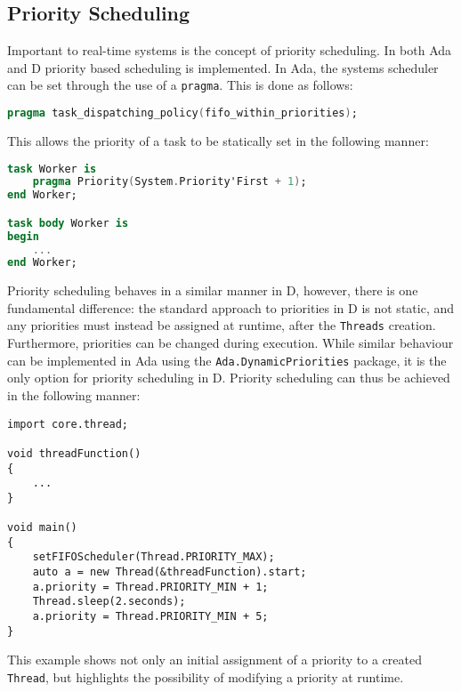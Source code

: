 \subsection{Priority Scheduling}
Important to real-time systems is the concept of priority scheduling. In both
Ada and D priority based scheduling is implemented. In Ada, the systems scheduler can
be set through the use of a \texttt{pragma}. This is done as follows: 
\begin{lstlisting}[basicstyle=\small,language=Ada]
pragma task_dispatching_policy(fifo_within_priorities); 
\end{lstlisting}
This allows the priority of a task to be statically set in the following manner: 
\begin{lstlisting}[basicstyle=\small,language=Ada]
task Worker is 
    pragma Priority(System.Priority'First + 1); 
end Worker;

task body Worker is 
begin 
    ...
end Worker; 
\end{lstlisting}
Priority scheduling behaves in a similar manner in D, however, there is one
fundamental difference: the standard approach to priorities in D is not static, 
and any priorities must instead be assigned at runtime, after the
\texttt{Threads} creation. 
Furthermore, priorities can be changed during execution. While similar
behaviour can be implemented in Ada using the
\texttt{Ada.Dynamic\textunderscore{}Priorities}
package, it is the only option for priority scheduling in D. 
Priority scheduling can thus be achieved in the following manner: 
\begin{lstlisting}[basicstyle=\small]
import core.thread; 

void threadFunction()
{
    ...
}

void main()
{
    setFIFOScheduler(Thread.PRIORITY_MAX);
    auto a = new Thread(&threadFunction).start;
    a.priority = Thread.PRIORITY_MIN + 1; 
    Thread.sleep(2.seconds); 
    a.priority = Thread.PRIORITY_MIN + 5; 
}
\end{lstlisting}
This example shows not only an initial assignment of a priority to a created
\texttt{Thread}, but highlights the possibility of modifying a priority at
runtime. 

